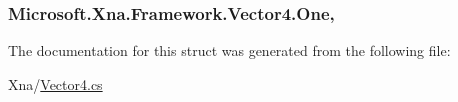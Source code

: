 \subsubsection[{One}]{ Microsoft.\+Xna.\+Framework.\+Vector4.\+One\hspace{0.3cm}{\ttfamily [static]}, {\ttfamily [get]}}\label{struct_microsoft_1_1_xna_1_1_framework_1_1_vector4_abb0fef93dba11303eee9db685eeca4d7}


The documentation for this struct was generated from the following file\+:\begin{DoxyCompactItemize}
\item 
Xna/\hyperlink{_vector4_8cs}{Vector4.\+cs}\end{DoxyCompactItemize}
